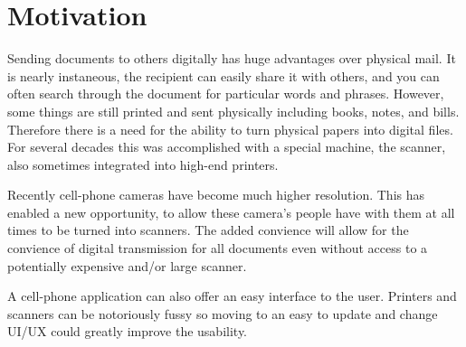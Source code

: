 \section{Motivation}
\label{sec:motivate}

Sending documents to others digitally has huge advantages over physical mail.
It is nearly instaneous, the recipient can easily share it with others, and you can often search through the document for particular words and phrases.
However, some things are still printed and sent physically including books, notes, and bills.
Therefore there is a need for the ability to turn physical papers into digital files.
For several decades this was accomplished with a special machine, the scanner, also sometimes integrated into high-end printers.

Recently cell-phone cameras have become much higher resolution.
This has enabled a new opportunity, to allow these camera's people have with them at all times to be turned into scanners.
The added convience will allow for the convience of digital transmission for all documents even without access to a potentially expensive and/or large scanner.

A cell-phone application can also offer an easy interface to the user.
Printers and scanners can be notoriously fussy so moving to an easy to update and change UI/UX could greatly improve the usability.
